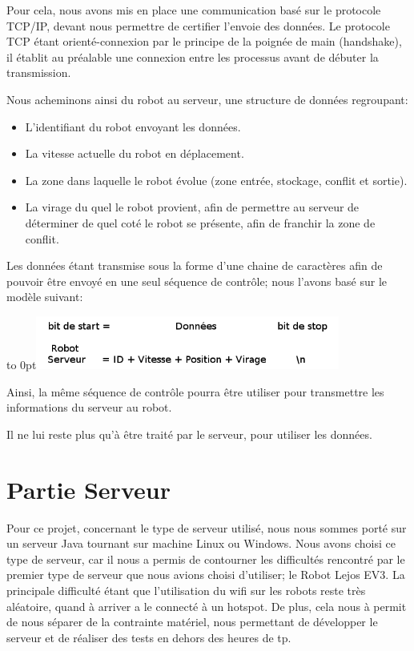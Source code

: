 \documentclass[french,a4paper,12pt]{report}
\begin{document}
Pour cela, nous avons mis en place une communication basé sur le protocole TCP/IP, devant nous permettre de certifier l'envoie des données. Le protocole TCP étant orienté-connexion par le principe de la poignée de main (handshake), il établit au préalable une connexion entre les processus avant de débuter la transmission.

Nous acheminons ainsi du robot au serveur, une structure de données regroupant:
  \begin{itemize}
  \item L'identifiant du robot envoyant les données.
  \item La vitesse actuelle du robot en déplacement.
  \item La zone dans laquelle le robot évolue (zone entrée, stockage, conflit et sortie).
  \item La virage du quel le robot provient, afin de permettre au serveur de déterminer de quel coté le robot se présente, afin de franchir la zone de conflit.
  \end{itemize}
  
Les données étant transmise sous la forme d'une chaine de caractères afin de pouvoir être envoyé en une seul  séquence de contrôle; nous l'avons basé sur le modèle suivant:

\hfill\hbox to 0pt{\hss\includegraphics[width=10cm]{sequ.png}\hss}\hfill\null\newline

Ainsi, la même séquence de contrôle pourra être utiliser pour transmettre les informations du serveur au robot.

Il ne lui reste plus qu'à être traité par le serveur, pour utiliser les données.

\section{Partie Serveur}%

Pour ce projet, concernant le type de serveur utilisé, nous nous sommes porté sur un serveur Java tournant sur machine Linux ou Windows.
Nous avons choisi ce type de serveur, car il nous a permis de contourner les difficultés rencontré par le premier type de serveur que nous avions choisi d'utiliser; le Robot Lejos EV3.
La principale difficulté étant que l'utilisation du wifi sur les robots reste très aléatoire, quand à arriver a le connecté à un hotspot. De plus, cela nous à permit de nous séparer de la contrainte matériel, nous permettant de développer le serveur et de réaliser des tests en dehors des heures de tp.
\end{document}
